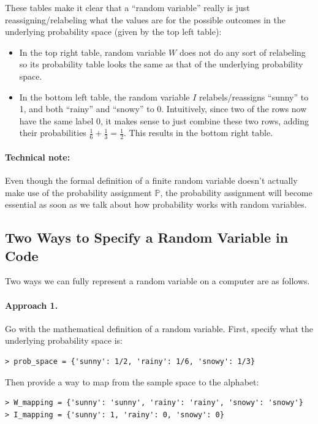 \documentclass[6008notes.tex]{subfiles}
\begin{document}
These tables make it clear that a ``random variable'' really is just reassigning/relabeling what the values are for the possible outcomes in the underlying probability space (given by the top left table):

\begin{itemize}
\item In the top right table, random variable $W$ does not do any sort of relabeling so its probability table looks the same as that of the underlying probability space.

\item In the bottom left table, the random variable $I$ relabels/reassigns ``sunny'' to 1, and both ``rainy'' and ``snowy'' to 0. Intuitively, since two of the rows now have the same label 0, it makes sense to just combine these two rows, adding their probabilities $\frac{1}{6}+\frac{1}{3}=\frac{1}{2}$. This results in the bottom right table.
\end{itemize}

\paragraph{Technical note:} Even though the formal definition of a finite random variable doesn't actually make use of the probability assignment $\mathbb {P}$, the probability assignment will become essential as soon as we talk about how probability works with random variables.

\subsection{Two Ways to Specify a Random Variable in Code}

Two ways we can fully represent a random variable on a computer are as follows.

\paragraph{Approach 1.} Go with the mathematical definition of a random variable. First, specify what the underlying probability space is:

\begin{lstlisting}
> prob_space = {'sunny': 1/2, 'rainy': 1/6, 'snowy': 1/3}
\end{lstlisting}

Then provide a way to map from the sample space to the alphabet:

\begin{lstlisting}
> W_mapping = {'sunny': 'sunny', 'rainy': 'rainy', 'snowy': 'snowy'}
> I_mapping = {'sunny': 1, 'rainy': 0, 'snowy': 0}
\end{lstlisting}
\end{document}
